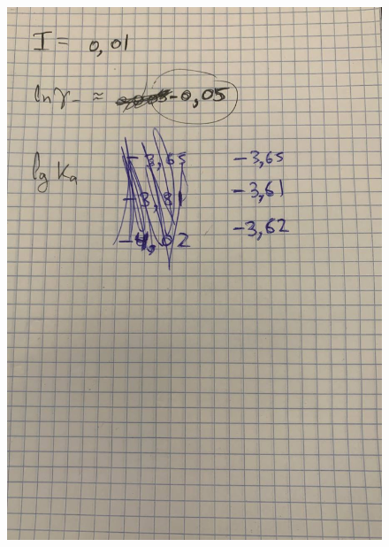 \documentclass[a4paper, 12pt]{article}
\begin{document}
\newpage
\begin{figure}[h!]
    \centering
    \includegraphics[width=150mm]{step1.jpg}
    \caption{}
\end{figure}
\end{document}

